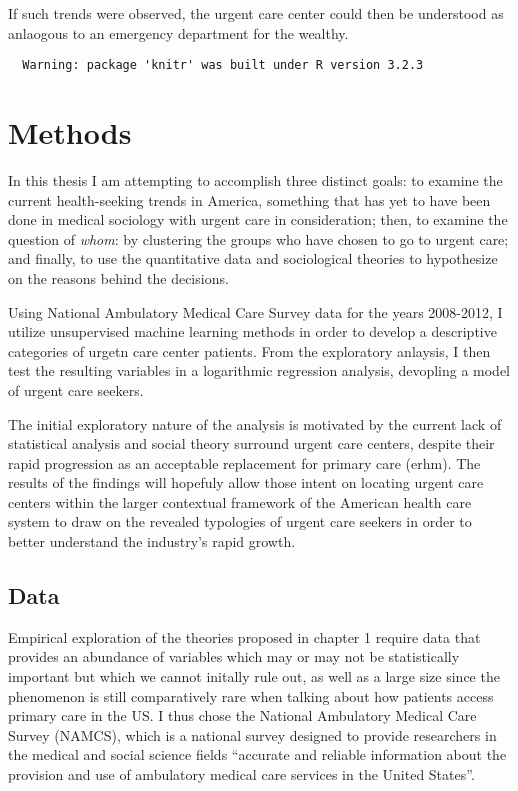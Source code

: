\documentclass[12pt,twoside]{reedthesis}
\begin{document}
  If such trends were observed, the urgent care center could then be
  understood as anlaogous to an emergency department for the wealthy.
  
  \doublespacing
  
  \begin{verbatim}
  Warning: package 'knitr' was built under R version 3.2.3
  \end{verbatim}
  
  \chapter{Methods}\label{methods}
  
  In this thesis I am attempting to accomplish three distinct goals: to
  examine the current health-seeking trends in America, something that has
  yet to have been done in medical sociology with urgent care in
  consideration; then, to examine the question of \textit{whom}: by
  clustering the groups who have chosen to go to urgent care; and finally,
  to use the quantitative data and sociological theories to hypothesize on
  the reasons behind the decisions.
  
  Using National Ambulatory Medical Care Survey data for the years
  2008-2012, I utilize unsupervised machine learning methods in order to
  develop a descriptive categories of urgetn care center patients. From
  the exploratory anlaysis, I then test the resulting variables in a
  logarithmic regression analysis, devopling a model of urgent care
  seekers.
  
  The initial exploratory nature of the analysis is motivated by the
  current lack of statistical analysis and social theory surround urgent
  care centers, despite their rapid progression as an acceptable
  replacement for primary care (erhm). The results of the findings will
  hopefuly allow those intent on locating urgent care centers within the
  larger contextual framework of the American health care system to draw
  on the revealed typologies of urgent care seekers in order to better
  understand the industry's rapid growth.
  
  \section{Data}\label{data}
  
  Empirical exploration of the theories proposed in chapter 1 require data
  that provides an abundance of variables which may or may not be
  statistically important but which we cannot initally rule out, as well
  as a large size since the phenomenon is still comparatively rare when
  talking about how patients access primary care in the US. I thus chose
  the National Ambulatory Medical Care Survey (NAMCS), which is a national
  survey designed to provide researchers in the medical and social science
  fields ``accurate and reliable information about the provision and use
  of ambulatory medical care services in the United States''.
  
\end{document}
